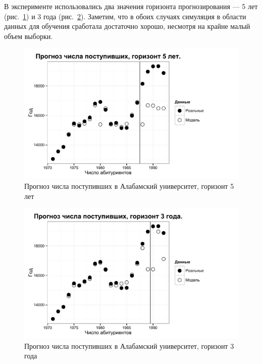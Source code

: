 В эксперименте использовались два значения горизонта прогнозирования --- 5 лет (рис.~\ref{figure:UA_model_h=5}) и 3 года (рис.~\ref{figure:UA_model_h=3}). Заметим, что в обоих случаях симуляция в области данных для обучения сработала достаточно хорошо, несмотря на крайне малый объем выборки. 

\begin{figure}[bhtp]
    \includegraphics{images/UA_model_h=5.pdf}
    \caption{Прогноз числа поступивших в Алабамский университет, \newline горизонт 5 лет}		
    \label{figure:UA_model_h=5}
\end{figure}

\begin{figure}[bhtp]
    \includegraphics{images/UA_model_h=3.pdf}
    \caption{Прогноз числа поступивших в Алабамский университет, \newline горизонт 3 года}		
    \label{figure:UA_model_h=3}
\end{figure}


